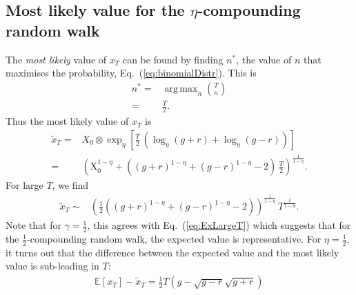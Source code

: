 \documentclass[11pt]{article}
\DeclareMathOperator*{\argmax}{arg\,max}
\begin{document}
\begin{multicols}{2}
\section{Most likely value for the $\eta$-compounding random walk}
The {\em most likely} value of $x_T$ can be found by finding $n^*$,  the value of $n$ that maximises the probability, Eq.~(\ref{eq:binomialDistr}). This is
\begin{align*}
n^* =& \argmax_{n} {T \choose n}\\
=& \frac{T}{2}.
\end{align*}
Thus the most likely value of $x_T$ is
\begin{align}
\nonumber \widetilde{x}_T =& X_0\otimes\exp_\eta\left[ \frac{T}{2}\,\left(\log_\eta(g+r) +\log_\eta(g-r)\right)\right]\\
\label{eq:typicalxT} =&\left(\text{X}_0^{1-\eta} + \left((g+r)^{1-\eta }+(g-r)^{1-\eta }-2\right)\, \frac{T}{2} \right)^\frac{1}{1-\eta}.
\end{align}
For large $T$, we find
\begin{align}
\widetilde{x}_T \sim & \left(\frac{1}{2}  \left((g+r)^{1-\eta }+(g-r)^{1-\eta }-2\right)\right)^\frac{1}{1-\eta} \, T^\frac{1}{1-\eta}.
\end{align}
Note that for $\gamma=\frac{1}{2}$, this agrees with Eq.~(\ref{eq:ExLargeT}) which suggests that for the $\frac{1}{2}$-compounding random walk, the expected value is representative. For $\eta=\frac{1}{2}$, it turns out that the difference between the expected value and the most likely value is sub-leading in $T$:
\begin{align}
\label{eq:difference}\mathbb{E}\left[x_T \right] -  \widetilde{x}_T = \frac{1}{2} T \left(g-\sqrt{g-r} \sqrt{g+r}\right)
\end{align}


\end{multicols}
\end{document}

